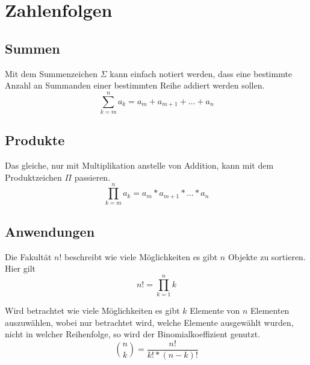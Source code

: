 \documentclass{article}
\begin{document}
\section{Zahlenfolgen}
\subsection{Summen}
Mit dem Summenzeichen $\Sigma$ kann einfach notiert werden, dass eine bestimmte Anzahl an Summanden einer bestimmten Reihe addiert werden sollen.
\[
 \sum_{k=m}^n a_k = a_m + a_{m+1} + \dots + a_n
\]

\subsection{Produkte}
Das gleiche, nur mit Multiplikation anstelle von Addition, kann mit dem Produktzeichen $\Pi$ passieren.
\[
 \prod_{k=m}^n a_k = a_m * a_{m+1} * \dots * a_n
\]

\subsection{Anwendungen}
Die Fakultät $n!$ beschreibt wie viele Möglichkeiten es gibt $n$ Objekte zu sortieren. Hier gilt
\[
 n! = \prod_{k=1}^n k
\]

Wird betrachtet wie viele Möglichkeiten es gibt $k$ Elemente von $n$ Elementen auszuwählen, wobei nur betrachtet wird, welche Elemente ausgewählt wurden, nicht in welcher Reihenfolge, so wird der Binomialkoeffizient genutzt.
\[
 \binom{n}{k} = \frac{n!}{k! * (n-k)!}
\] 
\end{document}
